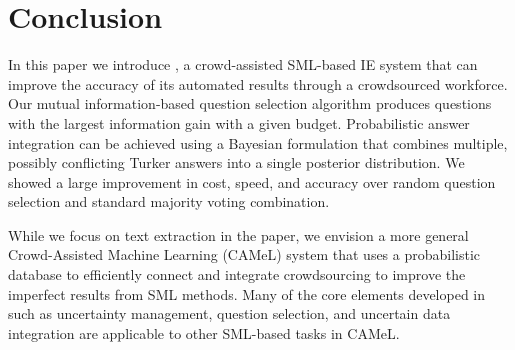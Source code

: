 \section{Conclusion}
\label{sec:conclusion}
\balance

In this paper we introduce \sysName, a crowd-assisted SML-based IE system that can improve the accuracy of its automated results through a crowdsourced workforce.  Our mutual information-based question selection algorithm produces questions with the largest information gain with a given budget.  Probabilistic answer integration can be achieved using a Bayesian formulation that combines multiple, possibly conflicting Turker answers into a single posterior distribution.  We showed a large improvement in cost, speed, and accuracy over random question selection and standard majority voting combination.  

While we focus on text extraction in the paper, we envision a more general Crowd-Assisted Machine Learning (CAMeL)
system that uses a probabilistic database to efficiently connect and integrate crowdsourcing to improve the imperfect results from SML methods. Many of the core elements developed in \sysName such as uncertainty management, question selection, and uncertain data integration are applicable to other SML-based tasks in CAMeL.


